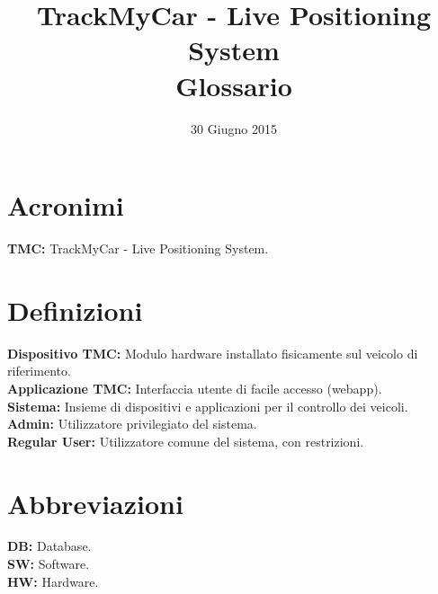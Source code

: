 \documentclass[a4paper,12pt]{article}
\begin{document}
\title{\textbf{TrackMyCar - Live Positioning System} \\ Glossario}
\date{30 Giugno 2015}
\maketitle

\section{Acronimi}
\textbf{TMC:} TrackMyCar - Live Positioning System.

\section{Definizioni}
\textbf{Dispositivo TMC:} Modulo hardware installato fisicamente sul veicolo di riferimento.\\
\textbf{Applicazione TMC:} Interfaccia utente di facile accesso (webapp).\\
\textbf{Sistema:} Insieme di dispositivi e applicazioni per il controllo dei veicoli.\\
\textbf{Admin:} Utilizzatore privilegiato del sistema.\\
\textbf{Regular User:} Utilizzatore comune del sistema, con restrizioni.\\

\section{Abbreviazioni}
\textbf{DB:} Database.\\
\textbf{SW:} Software.\\
\textbf{HW:} Hardware.\\
\end{document}
